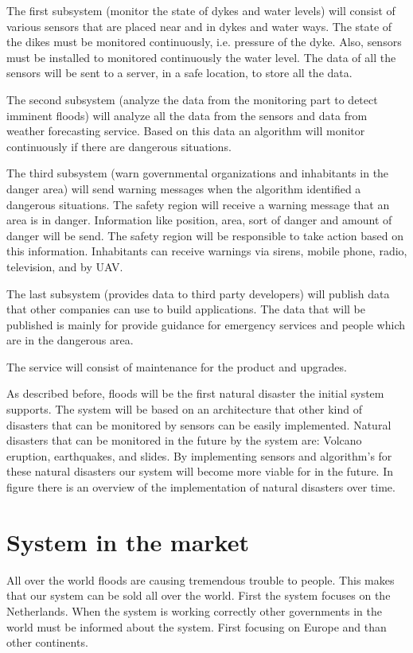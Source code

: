 The first subsystem (monitor the state of dykes and water levels) will consist of various sensors that are placed near and in dykes and water ways. The state of the dikes must be monitored continuously, i.e. pressure of the dyke. Also, sensors must be installed to monitored continuously the water level. The data of all the sensors will be sent to a server, in a safe location, to store all the data.

The second subsystem (analyze the data from the monitoring part to detect imminent floods) will analyze all the data from the sensors and data from weather forecasting service. Based on this data an algorithm will monitor continuously if there are dangerous situations.

The third subsystem (warn governmental organizations and inhabitants in the danger area) will send warning messages when the algorithm identified a dangerous situations. The safety region will receive a warning message that an area is in danger. Information like position, area, sort of danger and amount of danger will be send. The safety region will be responsible to take action based on this information. Inhabitants can receive warnings via sirens, mobile phone, radio, television, and by UAV.

The last subsystem (provides data to third party developers) will publish data that other companies can use to build applications. The data that will be published is mainly for provide guidance for emergency services and people which are in the dangerous area. 

The service will consist of maintenance for the product and upgrades.

As described before, floods will be the first natural disaster the initial system supports. The system will be based on an architecture that other kind of disasters that can be monitored by sensors can be easily implemented. Natural disasters that can be monitored in the future by the system are: Volcano eruption, earthquakes, and slides. By implementing sensors and algorithm's for these natural disasters our system will become more viable for in the future. In figure 
there is an overview of the implementation of natural disasters over time.

\section{System in the market}
All over the world floods are causing tremendous trouble to people. This makes that our system can be sold all over the world. First the system focuses on the Netherlands. When the system is working correctly other governments in the world must be informed about the system. First focusing on Europe and than other continents.

